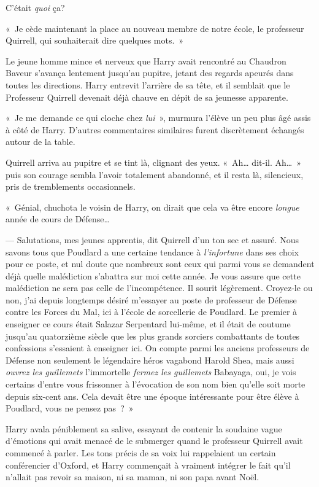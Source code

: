 C'était \emph{quoi} ça?

«~Je cède maintenant la place au nouveau membre de notre école, le professeur Quirrell, qui souhaiterait dire quelques mots.~»

Le jeune homme mince et nerveux que Harry avait rencontré au Chaudron Baveur s'avança lentement jusqu'au pupitre, jetant des regards apeurés dans toutes les directions.
Harry entrevit l'arrière de sa tête, et il semblait que le Professeur Quirrell devenait déjà chauve en dépit de sa jeunesse apparente.

«~Je me demande ce qui cloche chez \emph{lui}~», murmura l'élève un peu plus âgé assis à côté de Harry.
D'autres commentaires similaires furent discrètement échangés autour de la table.

Quirrell arriva au pupitre et se tint là, clignant des yeux.
«~Ah… dit-il. Ah…~» puis son courage sembla l'avoir totalement abandonné, et il resta là, silencieux, pris de tremblements occasionnels.

«~Génial, chuchota le voisin de Harry, on dirait que cela va être encore \emph{longue} année de cours de Défense…

--- Salutations, mes jeunes apprentis, dit Quirrell d'un ton sec et assuré.
Nous savons tous que Poudlard a une certaine tendance à \emph{l'infortune} dans ses choix pour ce poste, et nul doute que nombreux sont ceux qui parmi vous se demandent déjà quelle malédiction s'abattra sur moi cette année.
Je vous assure que cette malédiction ne sera pas celle de l'incompétence. Il sourit légèrement.
Croyez-le ou non, j'ai depuis longtemps désiré m'essayer au poste de professeur de Défense contre les Forces du Mal, ici à l'école de sorcellerie de Poudlard.
Le premier à enseigner ce cours était Salazar Serpentard lui-même, et il était de coutume jusqu'au quatorzième siècle que les plus grands sorciers combattants de toutes confessions s'essaient à enseigner ici.
On compte parmi les anciens professeurs de Défense non seulement le légendaire héros vagabond Harold Shea, mais aussi \emph{ouvrez les guillemets} l'immortelle \emph{fermez les guillemets} Babayaga, oui, je vois certains d'entre vous frissonner à l'évocation de son nom bien qu'elle soit morte depuis six-cent ans.
Cela devait être une époque intéressante pour être élève à Poudlard, vous ne pensez pas~?~»

Harry avala péniblement sa salive, essayant de contenir la soudaine vague d'émotions qui avait menacé de le submerger quand le professeur Quirrell avait commencé à parler.
Les tons précis de sa voix lui rappelaient un certain conférencier d'Oxford, et Harry commençait à vraiment intégrer le fait qu'il n'allait pas revoir sa maison, ni sa maman, ni son papa avant Noël.

